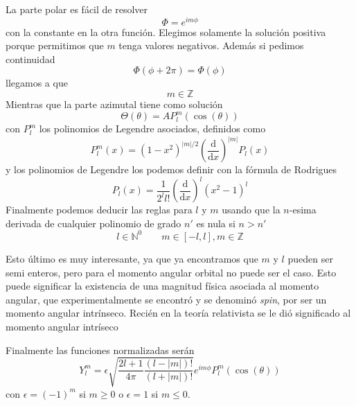 La parte polar es fácil de resolver
\begin{equation}
    \Phi = e^{i m \phi}
\end{equation}
con la constante en la otra función.
Elegimos solamente la solución positiva porque permitimos que $m$ tenga valores negativos. 
Además si pedimos continuidad 
\begin{equation}
    \Phi(\phi + 2\pi) = \Phi(\phi)
\end{equation}
llegamos a que 
\begin{equation}
    m \in \mathbb{Z}
\end{equation}
Mientras que la parte azimutal tiene como solución 
\begin{equation}
    \Theta(\theta) = A P^{m}_l(\cos(\theta))
\end{equation}
con $P^{m}_l$ los polinomios de Legendre asociados, definidos como
\begin{equation}
    P^{m}_l(x) = (1 - x^2)^{|m|/2} \left(\frac{\mathrm{d}}{\mathrm{d}x}\right)^{|m|} P_l(x)
    \end{equation}
y los polinomios de Legendre los podemos definir con la fórmula de Rodrigues
\begin{equation}
    P_l(x) = \frac{1}{2^l l!} \left(\frac{\mathrm{d}}{\mathrm{d}x}\right)^{l} (x^2 - 1)^l
\end{equation}
Finalmente podemos deducir las reglas para $l$ y $m$ usando que la $n$-esima derivada  de cualquier polinomio de grado $n'$ es nula si $n > n'$
\begin{equation}
    l \in \mathbb{N}^0 \qquad m \in [-l, l], m \in \mathbb{Z}
\end{equation}

Esto último es muy interesante, ya que ya encontramos que $m$ y $l$ pueden ser semi enteros, pero para el momento angular orbital no puede ser el caso. 
Esto puede significar la existencia de una magnitud física asociada al momento angular, que experimentalmente se encontró y se denominó \emph{spin}, por ser un momento angular intrínseco.
Recién en la teoría relativista se le dió significado al momento angular intríseco

Finalmente las funciones normalizadas serán
\begin{equation}
    Y^{m}_l = \epsilon \sqrt{\frac{2l + 1}{4\pi} \frac{(l - |m|)!}{(l + |m|)!}} e^{i m \phi} P^{m}_l(\cos(\theta))
\end{equation}
con $\epsilon = (-1)^m$ si $m \geq 0$ o $\epsilon = 1$ si $m \leq 0$.

